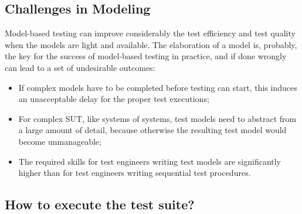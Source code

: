 \subsection{Challenges in Modeling}
Model-based testing can improve considerably the test 
efficiency and test quality when the models are light 
and available. The elaboration of a model is, probably, 
the key for the success of model-based testing in practice,
and if done wrongly~\cite{Peleska.2013} can lead to a set of undesirable 
outcomes:

\begin{itemize}
\item If complex models have to be completed before testing
can start, this induces an unacceptable delay for the
proper test executions;
\item For complex SUT, like systems of systems, test models 
need to abstract from a large amount of detail, because 
otherwise the resulting test model would become unmanageable;
\item The required skills for test engineers writing test 
models are significantly higher than for test engineers 
writing sequential test procedures.
\end{itemize}

\subsection{How to execute the test suite?}

